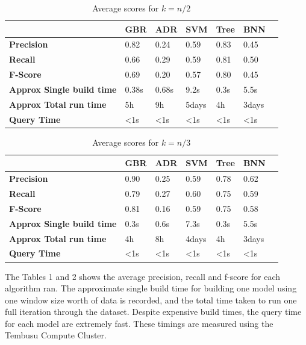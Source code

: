 \documentclass[letterpaper,11pt]{article}
\begin{document}
\begin{centering}
\begin{table}
\begin{tabular}{ | l | l | l | l | l | l | l |}
  \hline
   & \textbf{GBR}& \textbf{ADR} & \textbf{SVM} & \textbf{Tree} & \textbf{BNN}\\ \hline
  \textbf{Precision} & 0.82 & 0.24 & 0.59 & 0.83 & 0.45\\  \hline
  \textbf{Recall} & 0.66 & 0.29 & 0.59 & 0.81 & 0.50\\  \hline
  \textbf{F-Score} & 0.69 & 0.20 & 0.57 & 0.80 & 0.45\\  \hline
   \textbf{Approx Single build time} & 0.38s & 0.68s & 9.2s & 0.3s & 5.5s\\ \hline
    \textbf{Approx Total run time} & 5h & 9h & 5days & 4h & 3days\\ \hline
    \textbf{Query Time} & \textless1s & \textless1s & \textless1s & \textless1s & \textless1s\\ 
  \hline
\end{tabular}
\label{table:a}
\caption{Average scores for $k=n/2$}
\end{table}
\end{centering}

\begin{centering}
\begin{table}
\begin{tabular}{ | l | l | l | l | l | l | l |}
  \hline
   & \textbf{GBR}& \textbf{ADR} & \textbf{SVM} & \textbf{Tree} & \textbf{BNN}\\ \hline
  \textbf{Precision} & 0.90 & 0.25 & 0.59 & 0.78 & 0.62 \\  \hline
  \textbf{Recall} & 0.79 & 0.27 & 0.60 & 0.75 & 0.59 \\  \hline
  \textbf{F-Score} & 0.81 & 0.16 & 0.59 & 0.75 & 0.58 \\  \hline
    \textbf{Approx Single build time} & 0.3s & 0.6s & 7.3s & 0.3s & 5.5s\\ \hline
    \textbf{Approx Total run time} & 4h & 8h & 4days & 4h & 3days\\ \hline
    \textbf{Query Time} & \textless1s & \textless1s & \textless1s & \textless1s & \textless1s\\ 
  \hline
\end{tabular}
\label{table:b}
\caption{Average scores for $k=n/3$}  
\end{table}
\end{centering}

The Tables 1 and 2 shows the average precision, recall and f-score for each algorithm ran. The approximate single build time for building one model using one window size worth of data is recorded, and the total time taken to run one full iteration through the dataset. Despite expensive build times, the query time for each model are extremely fast. These timings are measured using the Tembusu Compute Cluster.
\end{document}
